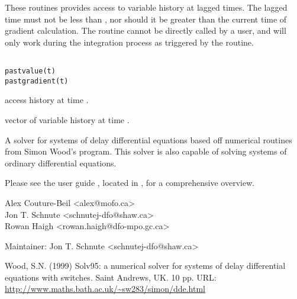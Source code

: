 \documentclass[letterpaper]{book}
\begin{document}
%
\begin{Description}\relax
These routines provides access to variable history at lagged times.
The lagged time  must not be less than , nor should 
it be greater than the current time of gradient calculation. The routine 
cannot be directly called by a user, and will only work during the
integration process as triggered by the  routine.
\end{Description}
%
\begin{Usage}
\begin{verbatim}
 
pastvalue(t)
pastgradient(t)
\end{verbatim}
\end{Usage}
%
\begin{Arguments}
\begin{ldescription}
\item[\code{t}] access history at time .
\end{ldescription}
\end{Arguments}
%
\begin{Value}
 vector of variable history at time . 
\end{Value}
%
\begin{SeeAlso}\relax
\end{SeeAlso}
%
\begin{Description}\relax
A solver for systems of delay differential equations based off 
numerical routines from Simon Wood's  program. 
This solver is also capable of solving systems of ordinary differential equations.
\end{Description}
%
\begin{Details}\relax
Please see the user guide , located in ,
for a comprehensive overview.
\end{Details}
%
\begin{Author}\relax
Alex Couture-Beil <alex@mofo.ca> \\{}
Jon T. Schnute <schnutej-dfo@shaw.ca> \\{}
Rowan Haigh <rowan.haigh@dfo-mpo.gc.ca>

Maintainer: Jon T. Schnute <schnutej-dfo@shaw.ca>
\end{Author}
%
\begin{References}\relax
Wood, S.N. (1999) Solv95: a numerical solver for systems of delay 
differential equations with switches. Saint Andrews, UK. 10 pp.
URL: \url{http://www.maths.bath.ac.uk/~sw283/simon/dde.html}
\end{References}
%
\begin{SeeAlso}\relax
\end{SeeAlso}
\printindex{}
\end{document}
